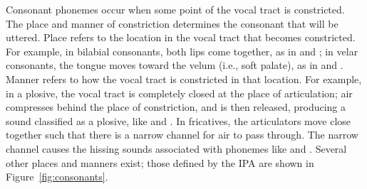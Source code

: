 Consonant phonemes occur when some point
of the vocal tract is constricted.
The place and manner of constriction
determines the consonant that will be uttered.
Place refers to the location in the vocal tract
that becomes constricted.
For example, in bilabial consonants,
both lips come together,
as in \ipa{[m]} and \ipa{[b]};
in velar consonants,
the tongue moves toward the velum
(i.e., soft palate),
as in \ipa{[k]} and \ipa{[g]}.
Manner refers to how the vocal tract
is constricted in that location.
For example, in a plosive,
the vocal tract is completely closed
at the place of articulation;
air compresses behind the place of constriction,
and is then released,
producing a sound classified
as a plosive, like \ipa{[t]} and \ipa{[k]}.
In fricatives,
the articulators move close together
such that there is a narrow channel
for air to pass through.
The narrow channel causes
the hissing sounds associated
with phonemes like \ipa{[s]} and \ipa{[f]}.
Several other places and manners exist;
those defined by the IPA are shown
in Figure~\ref{fig:consonants}.

